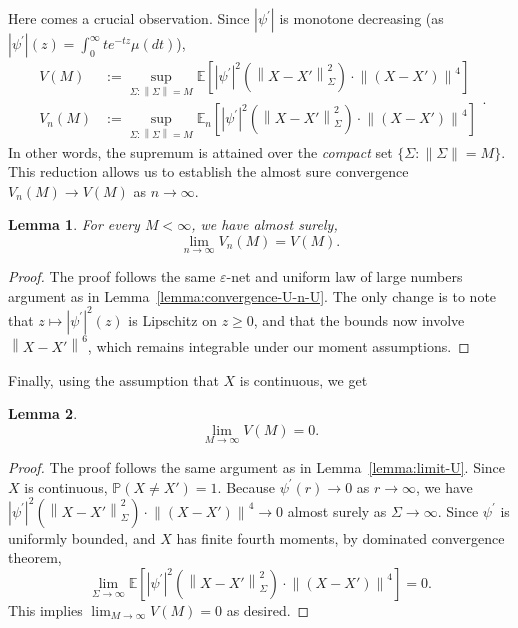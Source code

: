 \documentclass[sn-mathphys-num]{sn-jnl}%
\numberwithin{equation}{section}
\newcommand{\E}{\mathbb{E}}
\newcommand{\norm}[1]{\left\|{#1}\right\|} %
\renewcommand{\P}{\mathbb{P}}
\newtheorem{lemma}{Lemma}
\theoremstyle{thmstyleone}%
\theoremstyle{thmstyletwo}%
\theoremstyle{thmstylethree}%
\begin{document}
Here comes a crucial observation. Since $|\psi^\prime|$ is monotone decreasing (as $|\psi^\prime|(z) = \int_0^\infty t e^{-tz} \mu(dt)$), 
\begin{equation}
\label{eqn:identities-for-V-V_n}
\begin{split} 
	V(M) &:= \sup_{\Sigma: \norm{\Sigma} = M} \E[ |\psi^\prime|^2(\norm{X-X'}_\Sigma^2) \cdot \norm{(X-X')}^4]  \\
	V_n(M) &:= \sup_{\Sigma: \norm{\Sigma} = M} \E_n[ |\psi^\prime|^2(\norm{X-X'}_\Sigma^2) \cdot \norm{(X-X')}^4]
\end{split} .
\end{equation}
In other words, the supremum is attained over the \emph{compact} set $\{\Sigma : \|\Sigma\| = M\}$.
This reduction allows us to establish the almost sure convergence $V_n(M) \to V(M)$ as $n \to \infty$.


\vspace{.5em} 
\begin{lemma}
\label{lemma:convergence-V-n-V}
For every $M < \infty$, we have almost surely,
\begin{equation*}
	\lim_{n \to \infty} V_n(M) = V(M).
\end{equation*}
\end{lemma} 

\begin{proof} 
The proof follows the same $\varepsilon$-net and uniform law of large numbers argument as in 
Lemma~\ref{lemma:convergence-U-n-U}. %
The only change is to note that $z \mapsto |\psi^\prime|^2(z)$ is Lipschitz on $z\ge 0$, and that the bounds now involve $\norm{X - X'}^6$, 
which remains integrable under our moment assumptions.
\end{proof} 

Finally, using the assumption that $X$ is continuous, we get

\vspace{.5em} 
\begin{lemma}
\label{lemma:limit-V}
\begin{equation*}
	\lim_{M \to \infty} V(M) = 0.
\end{equation*}  
\end{lemma} 
\begin{proof} 
The proof follows the same argument as in Lemma~\ref{lemma:limit-U}.
Since $X$ is continuous, $\P(X \neq X') = 1$. Because $\psi^\prime(r) \to 0$ as $r \to \infty$, we have
$|\psi^\prime|^2(\norm{X-X'}_\Sigma^2) \cdot \norm{(X-X')}^4 \to 0$ almost surely as $\Sigma \to\infty$. 
Since $\psi^\prime$ is uniformly bounded, and $X$ has finite fourth moments, by dominated convergence theorem,
\begin{equation*}
	\lim_{\Sigma \to \infty} \E\!\left[|\psi^\prime|^2(\norm{X-X'}_\Sigma^2) \cdot \norm{(X-X')}^4 \right] = 0.
\end{equation*}  
This implies $\lim_{M \to \infty} V(M) = 0$ as desired. 
\end{proof} 
\end{document}
